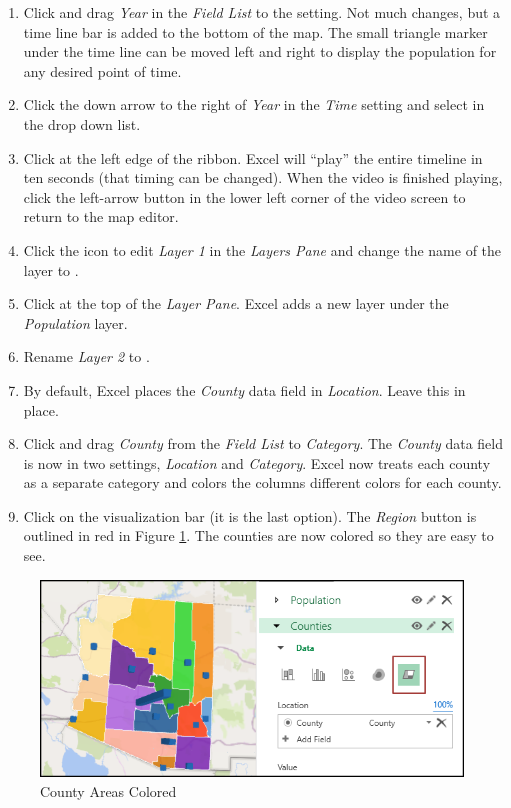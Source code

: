 \begin{enumerate}[resume]
	\item Click and drag \textit{Year} in the \textit{Field List} to the  setting. Not much changes, but a time line bar is added to the bottom of the map. The small triangle marker under the time line can be moved left and right to display the population for any desired point of time.
	\item Click the down arrow to the right of \textit{Year} in the \textit{Time} setting and select  in the drop down list.
	\item Click  at the left edge of the ribbon. Excel will ``play'' the entire timeline in ten seconds (that timing can be changed). When the video is finished playing, click the left-arrow button in the lower left corner of the video screen to return to the map editor.
	\item Click the  icon to edit \textit{Layer 1} in the \textit{Layers Pane} and change the name of the layer to .

	\item Click  at the top of the \textit{Layer Pane}. Excel adds a new layer under the \textit{Population} layer.
	\item Rename \textit{Layer 2} to .
	\item By default, Excel places the \textit{County} data field in \textit{Location}. Leave this in place.
	\item Click and drag \textit{County} from the \textit{Field List} to \textit{Category}. The \textit{County} data field is now in two settings, \textit{Location} and \textit{Category}. Excel now treats each county as a separate category and colors the columns different colors for each county.
	\item Click  on the visualization bar (it is the last option). The \textit{Region} button is outlined in red in Figure \ref{08:fig28}. The counties are now colored so they are easy to see. 
\end{enumerate}

\begin{figure}[H]
	\centering
	\includegraphics[width=\maxwidth{.85\linewidth}]{gfx/ch08_fig28}
	\caption{County Areas Colored}
	\label{08:fig28}
\end{figure}

